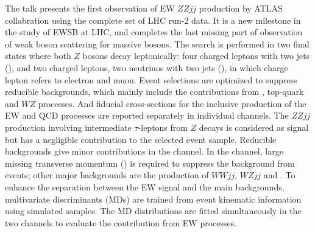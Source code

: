 The talk presents the first observation of EW $ZZjj$ production by ATLAS collabration using the complete set of LHC run-2 data.
It is a new milestone in the study of EWSB at LHC, and completes the last missing part of observation of weak boson scattering for massive bosons.
The search is performed in two final states where both $Z$ bosons decay leptonically: four charged leptons with two jets (\lllljj), and two charged leptons, two neutrinos with two jets (\llvvjj), in which charge lepton refers to electron and muon.
Event selections are optimized to suppress reducible backgrounds, which mainly include the contributions from \Zjet, top-quark and $WZ$ processes.
And fiducial cross-sections for the inclusive production of the EW and QCD processes are reported separately in individual channels.
The $ZZjj$ production involving intermediate $\tau$-leptons from $Z$ decays is considered as signal but has a negligible contribution to the selected event sample.
Reducible backgrounds give minor contributions in the \lllljj channel.
In the \llvvjj channel, large missing transverse momentum (\met) is required to suppress the background from \Zjet events; other major backgrounds are the production of $WWjj$, $WZjj$ and \ttbar.
To enhance the separation between the EW signal and the main backgrounds, multivariate discriminants (MDs) are trained from event kinematic information using simulated samples.
The MD distributions are fitted simultaneously in the two channels to evaluate the contribution from EW processes.

